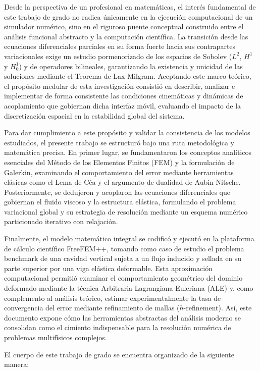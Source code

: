 \documentclass[12pt, letterpaper]{report}
\theoremstyle{definition}
\begin{document}
Desde la perspectiva de un profesional en matemáticas, el interés fundamental de este trabajo de grado no radica únicamente en la ejecución computacional de un simulador numérico, sino en el riguroso puente conceptual construido entre el análisis funcional abstracto y la computación científica. La transición desde las ecuaciones diferenciales parciales en su forma fuerte hacia sus contrapartes variacionales exige un estudio pormenorizado de los espacios de Sobolev ($L^2$, $H^1$ y $H_0^1$) y de operadores bilineales, garantizando la existencia y unicidad de las soluciones mediante el Teorema de Lax-Milgram. Aceptando este marco teórico, el propósito medular de esta investigación consistió en describir, analizar e implementar de forma consistente las condiciones cinemáticas y dinámicas de acoplamiento que gobiernan dicha interfaz móvil, evaluando el impacto de la discretización espacial en la estabilidad global del sistema.

Para dar cumplimiento a este propósito y validar la consistencia de los modelos estudiados, el presente trabajo se estructuró bajo una ruta metodológica y matemática precisa. En primer lugar, se fundamentaron los conceptos analíticos esenciales del Método de los Elementos Finitos (FEM) y la formulación de Galerkin, examinando el comportamiento del error mediante herramientas clásicas como el Lema de Céa y el argumento de dualidad de Aubin-Nitsche. Posteriormente, se dedujeron y acoplaron las ecuaciones diferenciales que gobiernan el fluido viscoso y la estructura elástica, formulando el problema variacional global y su estrategia de resolución mediante un esquema numérico particionado iterativo con relajación.

Finalmente, el modelo matemático integral se codificó y ejecutó en la plataforma de cálculo científico FreeFEM++, tomando como caso de estudio el problema benchmark de una cavidad vertical sujeta a un flujo inducido y sellada en su parte superior por una viga elástica deformable. Esta aproximación computacional permitió examinar el comportamiento geométrico del dominio deformado mediante la técnica Arbitraria Lagrangiana-Euleriana (ALE) y, como complemento al análisis teórico, estimar experimentalmente la tasa de convergencia del error mediante refinamiento de mallas ($h$-refinement). Así, este documento expone cómo las herramientas abstractas del análisis moderno se consolidan como el cimiento indispensable para la resolución numérica de problemas multifísicos complejos.


El cuerpo de este trabajo de grado se encuentra organizado de la siguiente manera:
\end{document}
